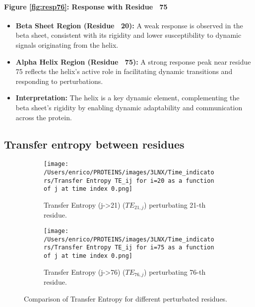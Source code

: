\documentclass[English, Lau, oneside]{sapthesis}
\begin{document}
\paragraph{Figure \ref{fig:resp76}: Response with Residue ~75}
\begin{itemize}
    \item \textbf{Beta Sheet Region (Residue ~20):} A weak response is observed in the beta sheet, consistent with its rigidity and lower susceptibility to dynamic signals originating from the helix.
    \item \textbf{Alpha Helix Region (Residue ~75):} A strong response peak near residue 75 reflects the helix's active role in facilitating dynamic transitions and responding to perturbations.
    \item \textbf{Interpretation:} The helix is a key dynamic element, complementing the beta sheet's rigidity by enabling dynamic adaptability and communication across the protein.
\end{itemize}



\newpage
\newpage









\subsection*{Transfer entropy between residues}
\begin{figure}[h!]
    \centering
    \begin{subfigure}[t]{0.48\textwidth}
        \centering
        \texttt{[image: /Users/enrico/PROTEINS/images/3LNX/Time\_indicators/Transfer Entropy TE\_ij for i=20 as a function of j at time index 0.png]}
        \caption{Transfer Entropy (j->21) ($TE_{21,j}$) perturbating 21-th residue.}
        \label{fig:TE21_i_j}
    \end{subfigure}
    \hfill
    \begin{subfigure}[t]{0.48\textwidth}
        \centering
        \texttt{[image: /Users/enrico/PROTEINS/images/3LNX/Time\_indicators/Transfer Entropy TE\_ij for i=75 as a function of j at time index 0.png]}
        \caption{Transfer Entropy (j->76) ($TE_{76,j}$) perturbating 76-th residue.}
        \label{fig:TE76_i_j}
    \end{subfigure}
    \caption{Comparison of Transfer Entropy for different perturbated residues.}
    \label{fig:TE_comparison_i_j}
\end{figure}
\end{document}
